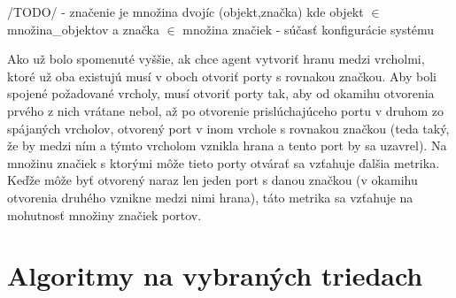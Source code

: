 \begin{defin}
/TODO/
- značenie je množina dvojíc (objekt,značka) kde objekt $\in $ množina\_objektov a značka $\in $ množina značiek
- súčasť konfigurácie systému
\end{defin}

Ako už bolo spomenuté vyššie, ak chce agent vytvoriť hranu medzi vrcholmi, ktoré už oba existujú musí v oboch otvoriť porty s rovnakou značkou. Aby boli spojené požadované vrcholy, musí otvoriť porty tak, aby od okamihu otvorenia prvého z nich vrátane nebol, až po otvorenie prislúchajúceho portu v druhom zo spájaných vrcholov, otvorený port v inom vrchole s rovnakou značkou (teda taký, že by medzi ním a týmto vrcholom vznikla hrana a tento port by sa uzavrel).
Na množinu značiek s ktorými môže tieto porty otvárať sa vzťahuje ďalšia metrika.
Keďže môže byť otvorený naraz len jeden port s danou značkou (v okamihu otvorenia druhého vznikne medzi nimi hrana), táto metrika sa vzťahuje na mohutnosť množiny značiek portov.


\section{Algoritmy na vybraných triedach}
\section{}